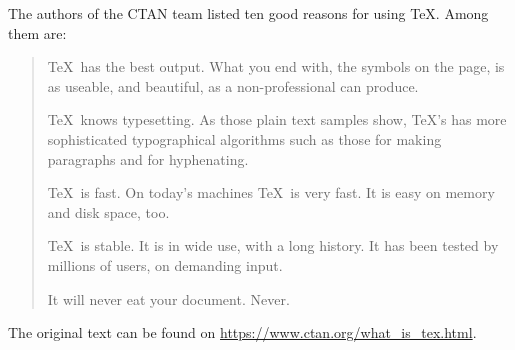 \documentclass{article}
\begin{document}
The authors of the CTAN team listed ten good reasons
for using \TeX. Among them are:
\begin{quotation}
\TeX\ has the best output. What you end with,
the symbols on the page, is as useable, and beautiful,
as a non-professional can produce.

\TeX\ knows typesetting. As those plain text samples
show, TeX's has more sophisticated typographical
algorithms such as those for making paragraphs
and for hyphenating.

\TeX\ is fast. On today's machines \TeX\ is very fast.
It is easy on memory and disk space, too.

\TeX\ is stable. It is in wide use, with a long
history. It has been tested by millions of users,
on demanding input.

It will never eat your document. Never.
\end{quotation}
The original text can be found on
\url{https://www.ctan.org/what_is_tex.html}.
\end{document}
